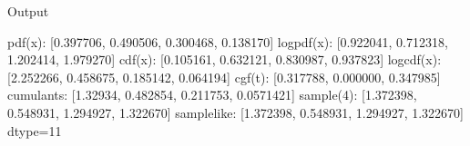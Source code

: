 \documentclass[letterpaper,10pt,english]{sphinxmanual}
\begin{document}
\begin{sphinxVerbatim}[commandchars=\\\{\}]
\end{sphinxVerbatim}

\sphinxAtStartPar
Output

\begin{sphinxVerbatim}[commandchars=\\\{\}]
pdf(x):      [0.397706, 0.490506, 0.300468, 0.138170]
logpdf(x):   [\PYGZhy{}0.922041, \PYGZhy{}0.712318, \PYGZhy{}1.202414, \PYGZhy{}1.979270]
cdf(x):      [0.105161, 0.632121, 0.830987, 0.937823]
logcdf(x):   [\PYGZhy{}2.252266, \PYGZhy{}0.458675, \PYGZhy{}0.185142, \PYGZhy{}0.064194]
cgf(t):      [\PYGZhy{}0.317788, 0.000000, 0.347985]
cumulants:   [1.32934, 0.482854, 0.211753, 0.0571421]
sample(\PYGZob{}4\PYGZcb{}): [1.372398, 0.548931, 1.294927, 1.322670]
sample\PYGZus{}like: [1.372398, 0.548931, 1.294927, 1.322670] dtype=11
\end{sphinxVerbatim}
\end{document}
